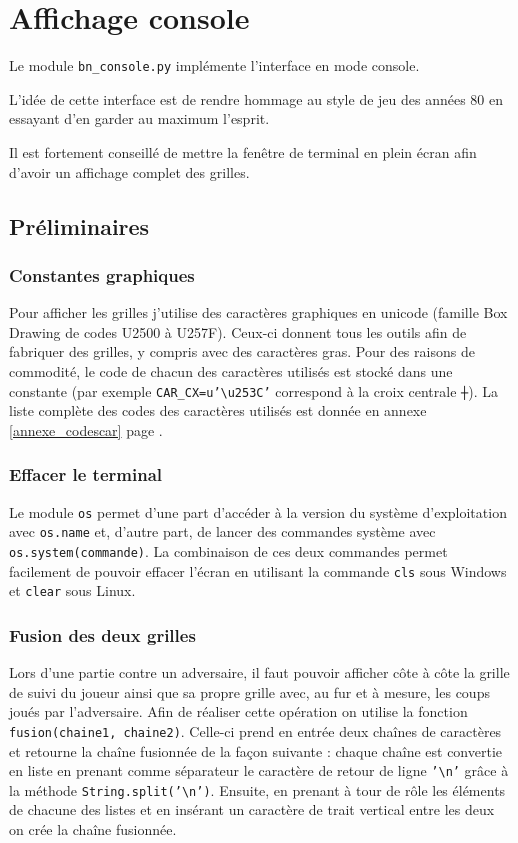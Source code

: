 \chapter{Affichage console}
Le module \texttt{bn\_console.py} implémente l'interface en mode console.

L'idée de cette interface est de rendre hommage au style de jeu des années 80 en essayant d'en garder au maximum l'esprit. 

Il est fortement conseillé de mettre la fenêtre de terminal en plein écran afin d'avoir un affichage complet des grilles. 

\section{Préliminaires}
\subsection{Constantes graphiques}
Pour afficher les grilles j'utilise des caractères graphiques en unicode (famille Box Drawing de codes U2500 à U257F). Ceux-ci donnent tous les outils afin de fabriquer des grilles, y compris avec des caractères gras. Pour des raisons de commodité, le code de chacun des caractères utilisés est stocké dans une constante (par exemple \texttt{CAR\_CX=u'\textbackslash u253C'} correspond à la croix centrale \texttt{┼}). La liste complète des codes des caractères utilisés est donnée en annexe \ref{annexe_codescar} page \pageref{annexe_codescar}.

\subsection{Effacer le terminal}
Le module \texttt{os} permet d'une part d'accéder à la version du système d'exploitation avec \texttt{os.name} et, d'autre part, de lancer des commandes système avec \texttt{os.system(commande)}. La combinaison de ces deux commandes permet facilement de pouvoir effacer l'écran en utilisant la commande \texttt{cls} sous Windows et \texttt{clear} sous Linux.

\subsection{Fusion des deux grilles}
Lors d'une partie contre un adversaire, il faut pouvoir afficher côte à côte la grille de suivi du joueur ainsi que sa propre grille avec, au fur et à mesure, les coups joués par l'adversaire. Afin de réaliser cette opération on utilise la fonction \texttt{fusion(chaine1, chaine2)}. Celle-ci prend en entrée deux chaînes de caractères et retourne la chaîne fusionnée de la façon suivante : chaque chaîne est convertie en liste en prenant comme séparateur le caractère de retour de ligne \texttt{'\textbackslash n'} grâce à la méthode \texttt{String.split('\textbackslash n')}. Ensuite, en prenant à tour de rôle les éléments de chacune des listes et en insérant un caractère de trait vertical entre les deux on crée la chaîne fusionnée. 


